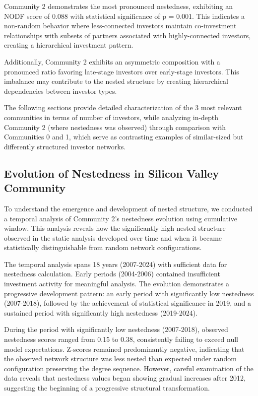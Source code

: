 \newcommand{\interestingCommunity}{2}
\newcommand{\interestingCommunityNODF}{0.088}
\newcommand{\interestingCommunityPValue}{0.001}

Community \interestingCommunity{} demonstrates the most pronounced nestedness, exhibiting an NODF score of \interestingCommunityNODF{} with statistical significance of p = \interestingCommunityPValue{}. This indicates a non-random behavior where less-connected investors maintain co-investment relationships with subsets of partners associated with highly-connected investors, creating a hierarchical investment pattern.

Additionally, Community \interestingCommunity{} exhibits an asymmetric composition with a pronounced ratio favoring late-stage investors over early-stage investors. This imbalance may contribute to the nested structure \cite{Mariani2019} by creating hierarchical dependencies between investor types.

The following sections provide detailed characterization of the 3 most relevant communities in terms of number of investors, while analyzing in-depth Community 2 (where nestedness was observed) through comparison with Communities 0 and 1, which serve as contrasting examples of similar-sized but differently structured investor networks.

\subsection{Evolution of Nestedness in Silicon Valley Community}

To understand the emergence and development of nested structure, we conducted a temporal analysis of Community 2's nestedness evolution using cumulative window. This analysis reveals how the significantly high nested structure observed in the static analysis developed over time and when it became statistically distinguishable from random network configurations.

The temporal analysis spans 18 years (2007-2024) with sufficient data for nestedness calculation. Early periods (2004-2006) contained insufficient investment activity for meaningful analysis. The evolution demonstrates a progressive development pattern: an early period with significantly low nestedness (2007-2018), followed by the achievement of statistical significance in 2019, and a sustained period with significantly high nestedness (2019-2024).

During the period with significantly low nestedness (2007-2018), observed nestedness scores ranged from 0.15 to 0.38, consistently failing to exceed null model expectations. Z-scores remained predominantly negative, indicating that the observed network structure was less nested than expected under random configuration preserving the degree sequence. However, careful examination of the data reveals that nestedness values began showing gradual increases after 2012, suggesting the beginning of a progressive structural transformation.

